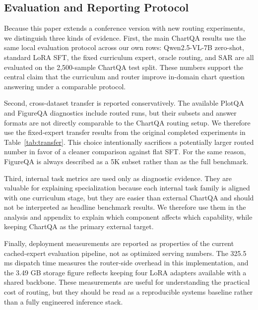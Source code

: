 \documentclass[journal]{IEEEtran}
\newcommand{\sar}{SAR}
\begin{document}
\subsection{Evaluation and Reporting Protocol}
\label{sec:reporting_protocol}
Because this paper extends a conference version with new routing experiments, we distinguish three kinds of evidence.
First, the main ChartQA results use the same local evaluation protocol across our own rows: Qwen2.5-VL-7B zero-shot, standard LoRA SFT, the fixed curriculum expert, oracle routing, and \sar{} are all evaluated on the 2,500-sample ChartQA test split.
These numbers support the central claim that the curriculum and router improve in-domain chart question answering under a comparable protocol.

Second, cross-dataset transfer is reported conservatively.
The available PlotQA and FigureQA diagnostics include routed runs, but their subsets and answer formats are not directly comparable to the ChartQA routing setup.
We therefore use the fixed-expert transfer results from the original completed experiments in Table~\ref{tab:transfer}.
This choice intentionally sacrifices a potentially larger routed number in favor of a cleaner comparison against flat SFT.
For the same reason, FigureQA is always described as a 5K subset rather than as the full benchmark.

Third, internal task metrics are used only as diagnostic evidence.
They are valuable for explaining specialization because each internal task family is aligned with one curriculum stage, but they are easier than external ChartQA and should not be interpreted as headline benchmark results.
We therefore use them in the analysis and appendix to explain which component affects which capability, while keeping ChartQA as the primary external target.

Finally, deployment measurements are reported as properties of the current cached-expert evaluation pipeline, not as optimized serving numbers.
The 325.5 ms dispatch time measures the router-side overhead in this implementation, and the 3.49 GB storage figure reflects keeping four LoRA adapters available with a shared backbone.
These measurements are useful for understanding the practical cost of routing, but they should be read as a reproducible systems baseline rather than a fully engineered inference stack.
\end{document}
